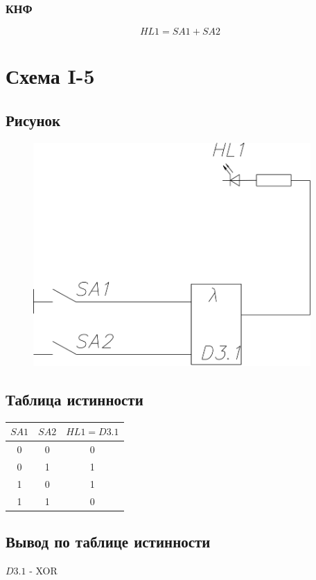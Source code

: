 \documentclass[a4paper]{article}
\begin{document}
\subsubsection{КНФ}
$$ HL1 = SA1 + SA2 $$

\pagebreak

\section{Схема I-5}
\subsection{Рисунок}
\begin{figure}[H]
    \centering
    \includegraphics[width=300pt]{5.png}
\end{figure}
\subsection{Таблица истинности}
\begin{table}[H]
    \centering
    \begin{tabular}{|c|c|c|}
        \hline
        $SA1$ & $SA2$ & $HL1 = D3.1$\\
        \hline
        0 & 0 & 0 \\
        0 & 1 & 1 \\
        1 & 0 & 1 \\
        1 & 1 & 0 \\
        \hline
    \end{tabular}
\end{table}

\subsection{Вывод по таблице истинности}
$ D3.1 $ - XOR
\end{document}
